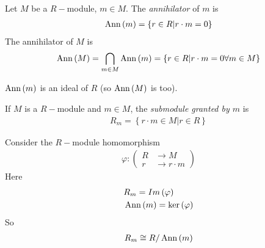 \documentclass[a4paper]{article}
\begin{document}
\begin{defi}
Let $M$ be a $R-$module, $m\in M$. The \emph{annihilator} of $m$ is
\begin{equation*}
\begin{aligned}
\operatorname{Ann}\left(m\right) = \left\{r\in R | r\cdot m=0\right\}
\end{aligned}
\end{equation*}
The annihilator of $M$ is
\begin{equation*}
\begin{aligned}
\operatorname{Ann}\left(M\right) = \bigcap_{m\in M} \operatorname{Ann}\left(m\right) = \left\{r\in R| r\cdot m = 0 \forall m\in M\right\}
\end{aligned}
\end{equation*}
\end{defi}

\begin{rem}
$\operatorname{Ann}\left(m\right)$ is an ideal of $R$ (so $\operatorname{Ann}\left(M\right)$ is too).
\end{rem}

\begin{defi}
If $M$ is a $R-$module and $m\in M$, the \emph{submodule granted by $m$} is
\begin{equation*}
\begin{aligned}
R_m = \left\{r\cdot m \in M | r\in R\right\}
\end{aligned}
\end{equation*}
\end{defi}

Consider the $R-$module homomorphism
\begin{equation*}
\begin{aligned}
\varphi:\left(
\begin{array}{ll}
R &\to M\\
r &\to r\cdot m
\end{array}
\right)
\end{aligned}
\end{equation*}
Here
\begin{equation*}
\begin{aligned}
&R_m = Im\left(\varphi\right)\\
&\operatorname{Ann}\left(m\right) = \ker\left(\varphi\right)
\end{aligned}
\end{equation*}
So
\begin{equation*}
\begin{aligned}
R_m \cong R/\operatorname{Ann}\left(m\right)
\end{aligned}
\end{equation*}
\end{document}
